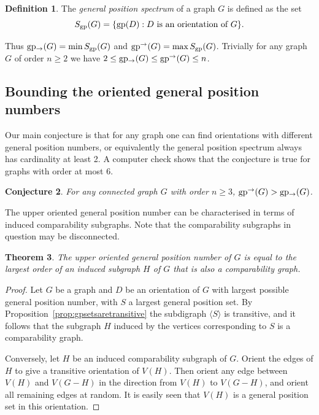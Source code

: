 \documentclass[a4paper,12pt]{article}
\newtheorem{theorem}{Theorem}[section]
\newtheorem{conjecture}[theorem]{Conjecture}
\theoremstyle{definition}
\newtheorem{definition}[theorem]{Definition}
\newcommand{\gp}{{\rm gp}}
\newcommand{\ugp}{{\rm gp^{\rightarrow }}}
\newcommand{\lgp}{{\rm gp_{\rightarrow }}}
\begin{document}
	\begin{definition}
		The \emph{general position spectrum} of a graph $G$ is defined as the set $$ S_{\gp}(G) = \{  \gp(D) : D \text{ is an orientation of } G \}.$$
	\end{definition}
	
	Thus $\lgp(G) = \min  S_{\gp}(G)$ and $ \ugp(G) = \max  S_{\gp}(G)$. Trivially for any graph $G$ of order $n \geq 2$ we have $2 \leq \lgp(G) \leq \ugp(G) \leq n$. 
	
	\subsection{Bounding the oriented general position numbers}
	
	Our main conjecture is that for any graph one can find orientations with different general position numbers, or equivalently the general position spectrum always has cardinality at least 2. A computer check shows that the conjecture is true for graphs with order at most 6.
	
	\begin{conjecture}\label{conj:orientation}
		For any connected graph $G$ with order $n \geq 3$, $\ugp (G) > \lgp (G)$.  
	\end{conjecture}
	
	The upper oriented general position number can be characterised in terms of induced comparability subgraphs. Note that the comparability subgraphs in question may be disconnected.
	
	\begin{theorem}\label{thm:comparability subgraphs}
		The upper oriented general position number of $G$ is equal to the largest order of an induced subgraph $H$ of $G$ that is also a comparability graph. 
	\end{theorem}
	\begin{proof}
		Let $G$ be a graph and $D$ be an orientation of $G$ with largest possible general position number, with $S$ a largest general position set. By Proposition~\ref{prop:gpsetsaretransitive} the subdigraph $\langle S\rangle$ is transitive, and it follows that the subgraph $H$ induced by the vertices corresponding to $S$ is a comparability graph. 
		
		Conversely, let $H$ be an induced comparability subgraph of $G$. Orient the edges of $H$ to give a transitive orientation of $V(H)$. Then orient any edge between $V(H)$ and $V(G-H)$ in the direction from $V(H)$ to $V(G-H)$, and orient all remaining edges at random. It is easily seen that $V(H)$ is a general position set in this orientation.
	\end{proof}
	
\end{document}
